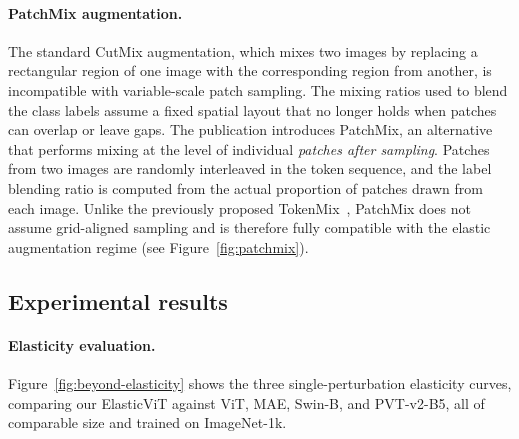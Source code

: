 \paragraph{PatchMix augmentation.} The standard CutMix augmentation, which mixes two images by replacing a rectangular region of one image with the corresponding region from another, is incompatible with variable-scale patch sampling. The mixing ratios used to blend the class labels assume a fixed spatial layout that no longer holds when patches can overlap or leave gaps. The publication introduces PatchMix, an alternative that performs mixing at the level of individual \emph{patches after sampling}. Patches from two images are randomly interleaved in the token sequence, and the label blending ratio is computed from the actual proportion of patches drawn from each image. Unlike the previously proposed TokenMix~\cite{liu2022tokenmix}, PatchMix does not assume grid-aligned sampling and is therefore fully compatible with the elastic augmentation regime (see Figure~\ref{fig:patchmix}).

\subsection{Experimental results}
\label{sec:beyond-results}


\paragraph{Elasticity evaluation.} Figure~\ref{fig:beyond-elasticity} shows the three single-perturbation elasticity curves, comparing our ElasticViT against ViT, MAE, Swin-B, and PVT-v2-B5, all of comparable size and trained on ImageNet-1k.

